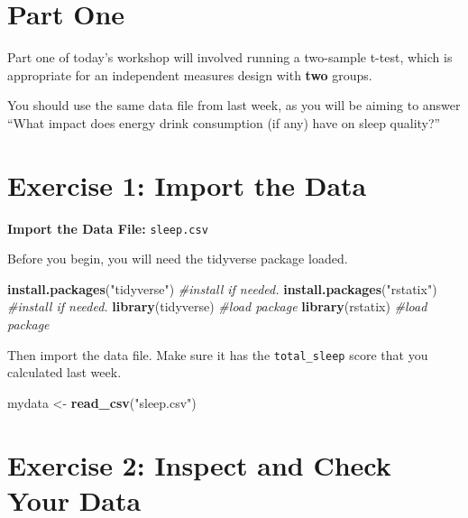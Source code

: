 \documentclass[
]{book}
\newenvironment{Shaded}{\begin{snugshade}}{\end{snugshade}}
\newcommand{\CommentTok}[1]{\textcolor[rgb]{0.56,0.35,0.01}{\textit{#1}}}
\newcommand{\FunctionTok}[1]{\textcolor[rgb]{0.13,0.29,0.53}{\textbf{#1}}}
\newcommand{\NormalTok}[1]{#1}
\newcommand{\OtherTok}[1]{\textcolor[rgb]{0.56,0.35,0.01}{#1}}
\newcommand{\StringTok}[1]{\textcolor[rgb]{0.31,0.60,0.02}{#1}}
\let\oldsection\section
\renewcommand{\section}{\needspace{5\baselineskip}\oldsection}
\begin{document}
\section{Part One}\label{part-one}

Part one of today's workshop will involved running a two-sample t-test, which is appropriate for an independent measures design with \textbf{two} groups.

You should use the same data file from last week, as you will be aiming to answer ``What impact does energy drink consumption (if any) have on sleep quality?''

\section{Exercise 1: Import the Data}\label{exercise-1-import-the-data-2}

\textbf{Import the Data File:} \texttt{sleep.csv}

Before you begin, you will need the tidyverse package loaded.

\begin{Shaded}
\begin{Highlighting}[]
\FunctionTok{install.packages}\NormalTok{(}\StringTok{"tidyverse"}\NormalTok{) }\CommentTok{\#install if needed.}
\FunctionTok{install.packages}\NormalTok{(}\StringTok{"rstatix"}\NormalTok{)   }\CommentTok{\#install if needed.}
\FunctionTok{library}\NormalTok{(tidyverse)            }\CommentTok{\#load package}
\FunctionTok{library}\NormalTok{(rstatix)              }\CommentTok{\#load package}
\end{Highlighting}
\end{Shaded}

Then import the data file. Make sure it has the \texttt{total\_sleep} score that you calculated last week.

\begin{Shaded}
\begin{Highlighting}[]
\NormalTok{mydata }\OtherTok{\textless{}{-}} \FunctionTok{read\_csv}\NormalTok{(}\StringTok{"sleep.csv"}\NormalTok{)}
\end{Highlighting}
\end{Shaded}

\section{Exercise 2: Inspect and Check Your Data}\label{exercise-2-inspect-and-check-your-data-2}
\end{document}
